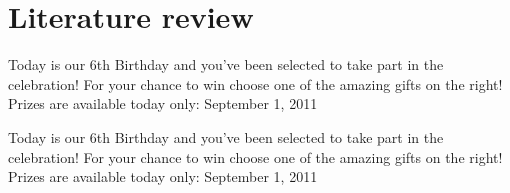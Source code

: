 \chapter{Literature review}

Today is our 6th Birthday and you’ve been selected to take part in the celebration! For your chance to win choose one of the amazing gifts on the right! Prizes are available today only: September 1, 2011 \citet{jon90}

Today is our 6th Birthday and you’ve been selected to take part in the celebration! For your chance to win choose one of the amazing gifts on the right! Prizes are available today only: September 1, 2011 \citet{varle85}

\citep{alf85}


